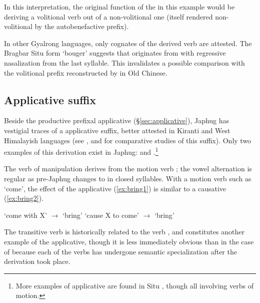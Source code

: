 In this interpretation, the original function of the  in this example would be deriving a volitional verb out of a non-volitional one (itself rendered non-volitional by the autobenefactive prefix). 

In other Gyalrong languages, only cognates of the derived verb  are attested. The Bragbar Situ form  `bouger' \citep{zhangshuya20these} suggests that  originates from  with regressive nasalization from the last syllable.   This invalidates a possible comparison with the volitional  prefix reconstructed by \citet[55]{bs14oc} in Old Chinese.

 
\subsection{Applicative  suffix} \label{sec:applicative.t}
Beside the productive prefixal  applicative (§\ref{sec:applicative}), Japhug has vestigial traces of a  applicative suffix, better attested in Kiranti and West Himalayish languages (see \citealt{michailovsky85dental}, \citet{jacques15derivational.khaling} and \citealt{jacques16ssuffixes} for comparative studies of this suffix). Only two examples of this derivation exist in Japhug:  and .\footnote{More examples of  applicative are found in Situ \citep{linyj17space, zhangshuya20these}, though all involving verbs of motion. }

The verb of manipulation  derives from the motion verb ; the vowel alternation is regular as pre-Japhug  changes to  in closed syllables. With a motion verb such as `come', the effect of the applicative (\ref{ex:bring1}) is similar to a causative  (\ref{ex:bring2}). 

\begin{exe}
\ex \label{ex:bring1}
\glt `come with X' $\rightarrow$ `bring'
\ex \label{ex:bring2}
\glt `cause X to come' $\rightarrow$ `bring'
\end{exe}

The transitive verb  is historically related to the verb , and constitutes another example of the  applicative, though it is less immediately obvious than in the case of  because each of the verbs has undergone semantic specialization after the derivation took place.

